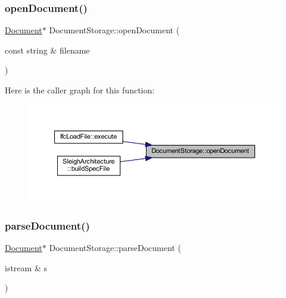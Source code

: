 \subsubsection{\texorpdfstring{openDocument()}{openDocument()}}
{\footnotesize\ttfamily \mbox{\hyperlink{class_document}{Document}}$\ast$ Document\+Storage\+::open\+Document (\begin{DoxyParamCaption}\item[{const string \&}]{filename }\end{DoxyParamCaption})}

Here is the caller graph for this function\+:
\nopagebreak
\begin{figure}[H]
\begin{center}
\leavevmode
\includegraphics[width=350pt]{class_document_storage_aaba17671821692988f7b2b78eb97f27e_icgraph}
\end{center}
\end{figure}
\mbox{\label{class_document_storage_a25cfe61f8b2cb67d621c46ae0104f84e}} 
\subsubsection{\texorpdfstring{parseDocument()}{parseDocument()}}
{\footnotesize\ttfamily \mbox{\hyperlink{class_document}{Document}}$\ast$ Document\+Storage\+::parse\+Document (\begin{DoxyParamCaption}\item[{istream \&}]{s }\end{DoxyParamCaption})}

